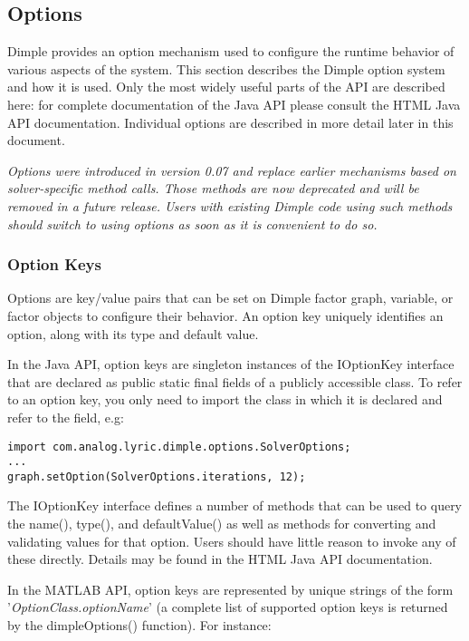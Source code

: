 \subsection{Options}
\label{sec:Options}

Dimple provides an option mechanism used to configure the runtime behavior of various aspects of the system. This section describes the Dimple option system and how it is used. \ifjava Only the most widely useful parts of the API are described here: for complete documentation of the Java API please consult the HTML Java API documentation. \fi Individual options are described in more detail later in this document.

\textit{Options were introduced in version 0.07 and replace earlier mechanisms based on solver-specific method calls. Those methods are now deprecated and will be removed in a future release. Users with existing Dimple code using such methods should switch to using options as soon as it is convenient to do so.}

\subsubsection{Option Keys}

Options are key/value pairs that can be set on Dimple factor graph, variable, or factor objects to configure their behavior. An option key uniquely identifies an option, along with its type and default value. 

\ifjava 
In the Java API, option keys are singleton instances of the IOptionKey interface that are declared as public static final fields of a publicly accessible class. To refer to an option key, you only need to import the class in which it is declared and refer to the field, e.g:

\begin{lstlisting}
import com.analog.lyric.dimple.options.SolverOptions;
...
graph.setOption(SolverOptions.iterations, 12);
\end{lstlisting}

The IOptionKey interface defines a number of methods that can be used to query the name(), type(), and defaultValue() as well as methods for converting and validating values for that option. Users should have little reason to invoke any of these directly. Details may be found in the HTML Java API documentation.

\fi

\ifmatlab
In the MATLAB API, option keys are represented by unique strings of the form '\textit{OptionClass.optionName}' (a complete list of supported option keys is returned by the dimpleOptions() function). For instance:

